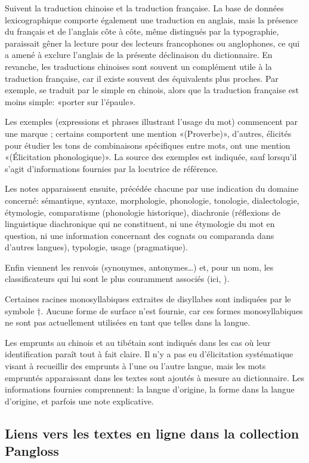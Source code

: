 Suivent la traduction chinoise et la traduction française. La base de données lexicographique comporte également une traduction en anglais, mais la présence du français et de l’anglais côte à côte, même distingués par la typographie, paraissait gêner la lecture pour des lecteurs francophones ou anglophones, ce qui a amené à exclure l’anglais de la présente déclinaison du dictionnaire. En revanche, les traductions chinoises sont souvent un complément utile à la traduction française, car il existe souvent des équivalents plus proches. Par exemple,  se traduit par le simple  en chinois, alors que la traduction française est moins simple: «porter sur l'épaule».

Les exemples (expressions et phrases illustrant l’usage du mot) commencent par une marque ; certains comportent une mention «(Proverbe)», d'autres, élicités pour étudier les tons de combinaisons spécifiques entre mots, ont une mention «(Élicitation phonologique)». La source des exemples est indiquée, sauf lorsqu'il s'agit d'informations fournies par la locutrice de référence.

Les notes apparaissent ensuite, précédée chacune par une indication du domaine concerné: sémantique, syntaxe, morphologie, phonologie, tonologie, dialectologie, étymologie,  comparatisme (phonologie historique), diachronie (réflexions de linguistique diachronique qui ne constituent, ni une étymologie du mot en question, ni une information concernant des cognats ou comparanda dans d’autres langues), typologie, usage (pragmatique).

Enfin viennent les renvois (synonymes, antonymes…) et, pour un nom, les classificateurs qui lui sont le plus couramment associés (ici, ).

Certaines racines monosyllabiques extraites de disyllabes sont indiquées par le symbole †. Aucune forme de surface n'est fournie, car ces formes monosyllabiques ne sont pas actuellement utilisées en tant que telles dans la langue.

Les emprunts au chinois et au tibétain sont indiqués dans les cas où leur identification paraît tout à fait claire. Il n'y a pas eu d'élicitation systématique visant à recueillir des emprunts à l'une ou l'autre langue, mais les mots empruntés apparaissant dans les textes sont ajoutés à mesure au dictionnaire. Les informations fournies comprennent: la langue d'origine, la forme dans la langue d'origine, et parfois une note explicative.

\subsection{Liens vers les textes en ligne dans la collection Pangloss}

